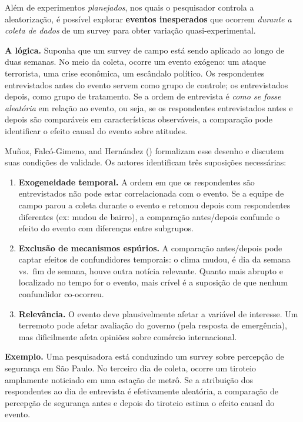 \documentclass[
]{article}
\begin{document}
Além de experimentos \emph{planejados}, nos quais o pesquisador controla a aleatorização, é possível explorar \textbf{eventos inesperados} que ocorrem \emph{durante a coleta de dados} de um survey para obter variação quasi-experimental.

\textbf{A lógica.} Suponha que um survey de campo está sendo aplicado ao longo de duas semanas. No meio da coleta, ocorre um evento exógeno: um ataque terrorista, uma crise econômica, um escândalo político. Os respondentes entrevistados antes do evento servem como grupo de controle; os entrevistados depois, como grupo de tratamento. Se a ordem de entrevista é \emph{como se fosse aleatória} em relação ao evento, ou seja, se os respondentes entrevistados antes e depois são comparáveis em características observáveis, a comparação pode identificar o efeito causal do evento sobre atitudes.

Muñoz, Falcó-Gimeno, and Hernández () formalizam esse desenho e discutem suas condições de validade. Os autores identificam três suposições necessárias:

\begin{enumerate}
\def\labelenumi{\arabic{enumi}.}
\item
  \textbf{Exogeneidade temporal.} A ordem em que os respondentes são entrevistados não pode estar correlacionada com o evento. Se a equipe de campo parou a coleta durante o evento e retomou depois com respondentes diferentes (ex: mudou de bairro), a comparação antes/depois confunde o efeito do evento com diferenças entre subgrupos.
\item
  \textbf{Exclusão de mecanismos espúrios.} A comparação antes/depois pode captar efeitos de confundidores temporais: o clima mudou, é dia da semana vs.~fim de semana, houve outra notícia relevante. Quanto mais abrupto e localizado no tempo for o evento, mais crível é a suposição de que nenhum confundidor co-ocorreu.
\item
  \textbf{Relevância.} O evento deve plausivelmente afetar a variável de interesse. Um terremoto pode afetar avaliação do governo (pela resposta de emergência), mas dificilmente afeta opiniões sobre comércio internacional.
\end{enumerate}

\textbf{Exemplo.} Uma pesquisadora está conduzindo um survey sobre percepção de segurança em São Paulo. No terceiro dia de coleta, ocorre um tiroteio amplamente noticiado em uma estação de metrô. Se a atribuição dos respondentes ao dia de entrevista é efetivamente aleatória, a comparação de percepção de segurança antes e depois do tiroteio estima o efeito causal do evento.
\end{document}
